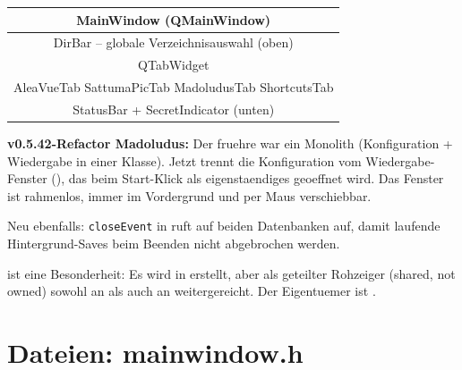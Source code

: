 \begin{center}
\ttfamily\small
\begin{tabular}{|c|}
\hline
\textbf{MainWindow (QMainWindow)} \\
\hline
DirBar -- globale Verzeichnisauswahl (oben) \\
\hline
QTabWidget \\
\quad AleaVueTab \textbar{} SattumaPicTab \textbar{}
MadoludusTab \textbar{} ShortcutsTab \\
\hline
StatusBar + SecretIndicator (unten) \\
\hline
\end{tabular}
\end{center}

\begin{neuin}
\textbf{v0.5.42-Refactor Madoludus:}
Der fruehre  war ein
Monolith (Konfiguration + Wiedergabe in einer Klasse).
Jetzt trennt  die Konfiguration vom
Wiedergabe-Fenster (), das beim
Start-Klick als eigenstaendiges 
geoeffnet wird. Das Fenster ist rahmenlos, immer im
Vordergrund und per Maus verschiebbar.

Neu ebenfalls: \verb|closeEvent| in 
ruft  auf beiden Datenbanken auf,
damit laufende Hintergrund-Saves beim Beenden nicht
abgebrochen werden.
\end{neuin}

 ist eine Besonderheit:
Es wird in  erstellt, aber als geteilter
Rohzeiger (shared, not owned) sowohl an
 als auch an 
weitergereicht. Der Eigentuemer ist .

\section{Dateien: mainwindow.h}

